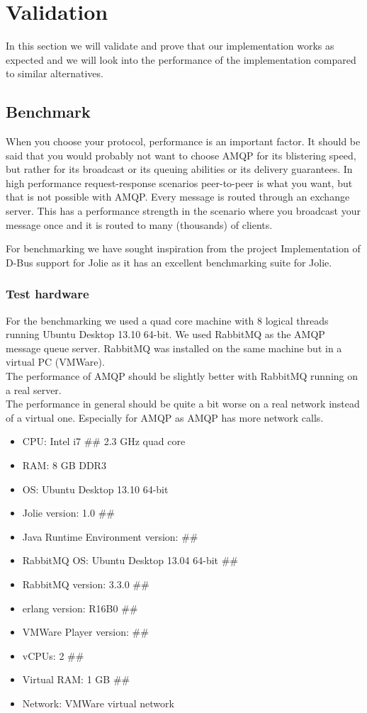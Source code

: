 \section{Validation}
In this section we will validate and prove that our implementation works as expected and we will look into the performance of the implementation compared to similar alternatives.
\subsection{Benchmark}
When you choose your protocol, performance is an important factor. It should be said that you would probably not want to choose AMQP for its blistering speed, but rather for its broadcast or its queuing abilities or its delivery guarantees. In high performance request-response scenarios peer-to-peer is what you want, but that is not possible with AMQP. Every message is routed through an exchange server. This has a performance strength in the scenario where you broadcast your message once and it is routed to many (thousands) of clients.

For benchmarking we have sought inspiration from the project Implementation of D-Bus support for Jolie\cite{D-Bus} as it has an excellent benchmarking suite for Jolie.
\subsubsection{Test hardware}
For the benchmarking we used a quad core machine with 8 logical threads running Ubuntu Desktop 13.10 64-bit. We used RabbitMQ as the AMQP message queue server. RabbitMQ was installed on the same machine but in a virtual PC (VMWare).\\
The performance of AMQP should be slightly better with RabbitMQ running on a real server.\\
The performance in general should be quite a bit worse on a real network instead of a virtual one. Especially for AMQP as AMQP has more network calls.
\begin{itemize}
\item CPU: Intel i7 \#\# 2.3 GHz quad core
\item RAM: 8 GB DDR3
\item OS: Ubuntu Desktop 13.10 64-bit
\item Jolie version: 1.0 \#\#
\item Java Runtime Environment version: \#\#
\item RabbitMQ OS: Ubuntu Desktop 13.04 64-bit \#\#
\item RabbitMQ version: 3.3.0 \#\#
\item erlang version: R16B0 \#\#
\item VMWare Player version: \#\#
\item vCPUs: 2 \#\#
\item Virtual RAM: 1 GB \#\#
\item Network: VMWare virtual network
\end{itemize}
